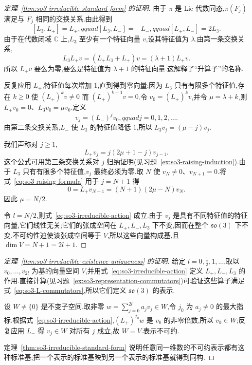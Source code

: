 \begin{proof}[定理~\ref{thm:so3-irreducible-standard-form} 的证明]
由于 $\pi$ 是 Lie 代数同态,$\pi(F_j)$ 满足与 $F_j$ 相同的交换关系.由此得到
\[
[L_3,L_+]=L_+,qquad [L_3,L_-]=-L_-,qquad [L_+,L_-]=2L_3.
\label{eq:so3-L-commutators}
\]
由于在代数闭域 $\mathbb C$ 上,$L_3$ 至少有一个特征向量 $v$,设其特征值为 $\lambda$.由第一条交换关系,
\[
L_3L_+v=(L_+L_3+L_+)v=(\lambda+1)L_+v.
\]
所以 $L_+v$ 要么为零,要么是特征值为 $\lambda+1$ 的特征向量.这解释了“升算子”的名称.

反复应用 $L_+$,特征值每次增加 $1$,直到得到零向量;因为 $L_3$ 只有有限多个特征值,存在 $k\geq0$ 使 $(L_+)^kv\neq0$ 而 $(L_+)^{k+1}v=0$.令 $v_0=(L_+)^kv$,并令 $\mu=\lambda+k$,则 $L_+v_0=0$、$L_3v_0=\mu v_0$.定义
\[
v_j=(L_-)^jv_0,qquad j=0,1,2,\ldots.
\]
由第二条交换关系,$L_-$ 使 $L_3$ 的特征值降低 $1$,所以 $L_3v_j=(\mu-j)v_j$.

我们声称对 $j\geq1$,
\[
L_+v_j=j(2\mu+1-j)v_{j-1}.
\label{eq:so3-raising-formula}
\]
这个公式可用第三条交换关系对 $j$ 归纳证明(见习题~\ref{ex:so3-raising-induction}).由于 $L_3$ 只有有限多个特征值,$v_j$ 最终必须为零.取 $N$ 使 $v_N\neq0$、$v_{N+1}=0$.将式~\eqref{eq:so3-raising-formula} 用于 $j=N+1$ 得
\[
0=L_+v_{N+1}=(N+1)(2\mu-N)v_N.
\]
因此 $\mu=N/2$.

令 $l=N/2$,则式~\eqref{eq:so3-irreducible-action} 成立.由于 $v_j$ 是具有不同特征值的特征向量,它们线性无关;它们的张成空间在 $L_+,L_-,L_3$ 下不变,因而在整个 $\mathfrak{so}(3)$ 下不变.不可约性迫使该张成空间等于 $V$,所以这些向量构成基,且 $\dim V=N+1=2l+1$.
\end{proof}

\begin{proof}[定理~\ref{thm:so3-irreducible-existence-uniqueness} 的证明]
给定 $l=0,\frac12,1,\ldots$,取以 $v_0,\ldots,v_{2l}$ 为基的向量空间 $V$,并用式~\eqref{eq:so3-irreducible-action} 定义 $L_+,L_-,L_3$ 的作用.直接计算(见习题~\ref{ex:so3-representation-commutators})可验证这些算子满足式~\eqref{eq:so3-L-commutators},所以它们定义 $\mathfrak{so}(3)$ 的表示.

设 $W\neq\{0\}$ 是不变子空间,取非零 $w=\sum_{j=0}^{2l}a_jv_j\in W$,令 $j_0$ 为 $a_j\neq0$ 的最大指标.根据式~\eqref{eq:so3-irreducible-action},$(L_+)^{j_0}w$ 是 $v_0$ 的非零倍数,所以 $v_0\in W$;反复应用 $L_-$ 得 $v_j\in W$ 对所有 $j$ 成立,故 $W=V$.表示不可约.

定理~\ref{thm:so3-irreducible-standard-form} 说明任意同一维数的不可约表示都有这种标准基;把一个表示的标准基映到另一个表示的标准基就得到同构.
\end{proof}

